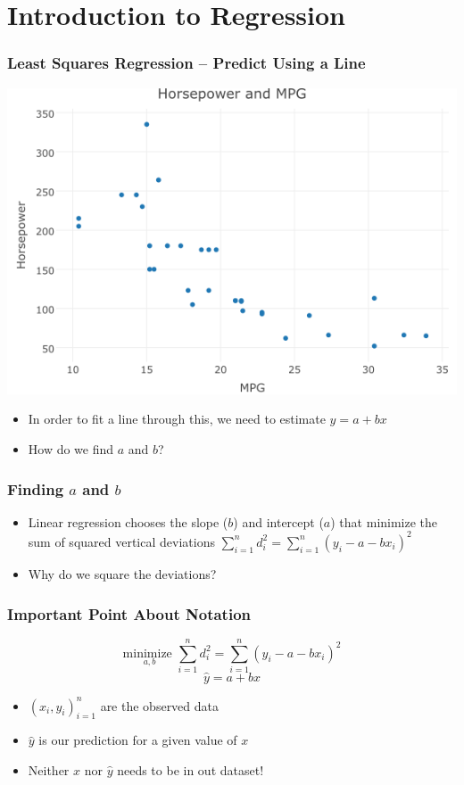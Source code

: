 \documentclass{beamer}
\begin{document}
\section{Introduction to Regression}
\begin{frame}
\frametitle{Least Squares Regression -- Predict Using a Line}
	\begin{center}
		\includegraphics[scale=0.4]{./images/cars.png}
	\end{center}
	\begin{itemize}
		\item In order to fit a line through this, we need to estimate $y = a + bx$
		\item How do we find $a$ and $b$?
	\end{itemize}
\end{frame}
	
\begin{frame}
\frametitle{Finding $a$ and $b$}
	\begin{itemize}
		\item Linear regression chooses the slope ($b$) and intercept ($a$) that \alert{minimize the 		sum of squared vertical deviations}
		$\displaystyle\sum_{i = 1}^n d_i^2 = \sum_{i = 1}^n (y_i - a - b x_i)^2$
		\medskip
		\item Why do we square the deviations?
	\end{itemize}
\end{frame}

\begin{frame}
\frametitle{Important Point About Notation}
  	$$
  	\boxed{\underset{a, b}{\mbox{minimize }}\sum_{i = 1}^n d_i^2 = \sum_{i = 1}^n 
  	(y_i - a - b x_i)^2}
  	$$
	$$
	\boxed{\hat{y} = a + bx}
	$$
	\begin{itemize}
		\item $(x_i, y_i)_{i = 1}^n$ are the \alert{observed data}
		\item $\widehat{y}$ is our \alert{prediction} for a given value of $x$
		\item Neither $x$ nor $\widehat{y}$ needs to be in out dataset!
	\end{itemize}
\end{frame}
\end{document}
